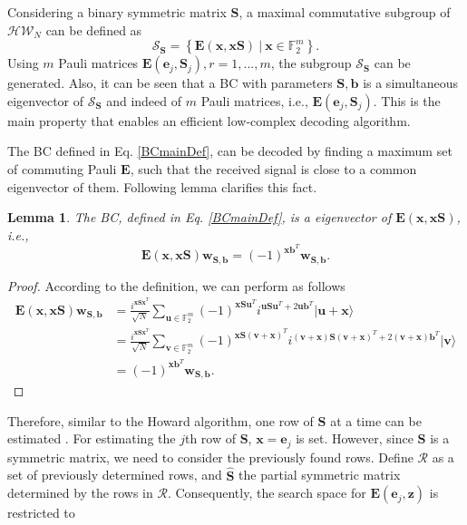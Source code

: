 \documentclass[lettersize,journal,onecolumn]{IEEEtran}
\newtheorem{lemma}{Lemma}
\begin{document}
Considering a binary symmetric matrix $\mathbf{S}$, a maximal commutative subgroup of $\mathcal{HW}_N$ can be defined as 
\begin{equation}
	\mathcal{S}_{\mathbf{S}} = \left\{ \mathbf{E}\left(\mathbf{x}, \mathbf{x S} \right) \: | \: \mathbf{x}\in \mathbb{F}_2^m \right\}.
\end{equation}
Using $m$ Pauli matrices $\mathbf{E}\left(\mathbf{e}_j, \mathbf{S}_j\right), r=1,...,m$, the subgroup $\mathcal{S}_{\mathbf{S}}$ can be generated. Also, it can be seen that a BC with parameters $\mathbf{S, b}$ is a simultaneous eigenvector of $\mathcal{S}_{\mathbf{S}}$ and indeed of $m$ Pauli matrices, i.e., $\mathbf{E}\left(\mathbf{e}_j, \mathbf{S}_j\right)$. This is the main property that enables an efficient low-complex decoding algorithm.

The BC defined in Eq. \eqref{BCmainDef}, can be decoded by finding a maximum set of commuting Pauli $\mathbf{E}$, such that the received signal is close to a common eigenvector of them. Following lemma clarifies this fact.
\begin{lemma}\label{LemmaBCeigenvector}
	The BC, defined in Eq. \eqref{BCmainDef}, is a eigenvector of $\mathbf{E}\left(\mathbf{x}, \mathbf{x S}\right)$, i.e.,
	\begin{equation}
		\mathbf{E}\left(\mathbf{x}, \mathbf{x S}\right) \mathbf{w}_{\mathbf{S}, \mathbf{b}} = \left(-1\right)^{\mathbf{x b}^T} \mathbf{w}_{\mathbf{S}, \mathbf{b}}.
	\end{equation}
\end{lemma}
\begin{proof}
	According to the definition, we can perform as follows
	\begin{align}
		\mathbf{E}\left(\mathbf{x}, \mathbf{x S}\right) \mathbf{w}_{\mathbf{S}, \mathbf{b}} &= \frac{i^{\mathbf{xSx}^T}}{\sqrt{N}}\sum_{\mathbf{u}\in \mathbb{F}_2^m}{(-1)^{\mathbf{xS u}^T} i^{\mathbf{uSu}^T +2\mathbf{u b}^T} |\mathbf{u+x} \rangle } \nonumber \\
		&= \frac{i^{\mathbf{xSx}^T}}{\sqrt{N}}\sum_{\mathbf{v}\in \mathbb{F}_2^m}{(-1)^{\mathbf{xS}\left(\mathbf{v+x}\right)^T } i^{\left(\mathbf{v+x}\right) \mathbf{S} \left(\mathbf{v+x}\right)^T +2\left(\mathbf{v+x}\right)\mathbf{b}^T} |\mathbf{v} \rangle } \nonumber \\
		&= (-1)^{\mathbf{x b}^T}\mathbf{w}_{\mathbf{S, b}}.
	\end{align}
\end{proof}
\noindent Therefore, similar to the Howard algorithm, one row of $\mathbf{S}$ at a time can be estimated \cite{HowardAlg08}. For estimating the $j$th row of $\mathbf{S}$, $\mathbf{x}=\mathbf{e}_j$ is set. However, since $\mathbf{S}$ is a symmetric matrix, we need to consider the previously found rows. Define $\mathcal{R}$ as a set of previously determined rows, and $\widehat{\mathbf{S}}$ the partial symmetric matrix determined by the rows in $\mathcal{R}$. Consequently, the search space for $\mathbf{E}\left(\mathbf{e}_j,\mathbf{z} \right)$ is restricted to
\end{document}
